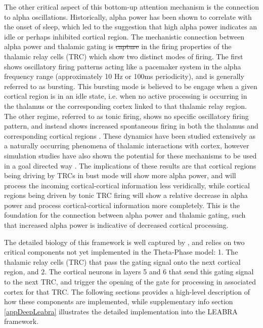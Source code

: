 \documentclass[11pt, titlepage, twoside]{article}
\providecommand{\DIFadd}[1]{{\protect\color{blue}\uwave{#1}}} %
\providecommand{\DIFdel}[1]{{\protect\color{red}\sout{#1}}}                      %
\providecommand{\DIFaddbegin}{} %
\providecommand{\DIFaddend}{} %
\providecommand{\DIFdelbegin}{} %
\providecommand{\DIFdelend}{} %
\begin{document}
The other critical aspect of this bottom-up attention mechanism is the connection to alpha oscillations.  Historically, alpha power has been shown to correlate with the onset of sleep, which led to the suggestion that high alpha power indicates an idle or perhaps inhibited cortical region.  The mechanistic connection between alpha power and thalamic gating is \DIFdelbegin \DIFdel{capture }\DIFdelend \DIFaddbegin \DIFadd{captured }\DIFaddend in the firing properties of the thalamic relay cells (TRC) which show two distinct modes of firing.  The first shows oscillatory firing patterns acting like a pacemaker system in the alpha frequency range (approximately 10 Hz or 100ms periodicity), and is generally referred to as bursting.  This bursting mode is believed to be engage when a given cortical region is in an idle state, i.e. when no active processing is occurring in the thalamus or the corresponding cortex linked to that thalamic relay region.  The other regime, referred to as tonic firing, shows no specific oscillatory firing pattern, and instead shows increased spontaneous firing in both the thalamus and corresponding cortical regions \cite{LerescheLightowlerSolteszEtAl91,ShermanGuillery06,LopesdaSilva91}.  These dynamics have been studied extensively as a naturally occurring phenomena of thalamic interactions with cortex, however simulation studies have also shown the potential for these mechanisms to be used in a goal directed way \cite{HindriksvanPutten13,VijayanKopell12,LeeWhittingtonKopell13}. The implications of these results are that cortical regions being driving by TRCs in bust mode will show more alpha power, and will process the incoming cortical-cortical information less veridically, while cortical regions being driven by tonic TRC firing will show a relative decrease in alpha power and process cortical-cortical information more completely.  This is the foundation for the connection between alpha power and thalamic gating, such that increased alpha power is indicative of decreased cortical processing.

The detailed biology of this framework is well captured by \textcite{ShermanGuillery06}, and relies on two critical components not yet implemented in the Theta-Phase model: 1. The thalamic relay cells (TRC) that pass the gating signal onto the next cortical region, and 2. The cortical neurons in layers 5 and 6 that send this gating signal to the next TRC, and trigger the opening of the gate for processing in associated cortex for that TRC.  The following sections provides a high-level description of how these components are implemented, while supplementary info section \ref{appDeepLeabra} illustrates the detailed implementation into the LEABRA framework.
\end{document}
